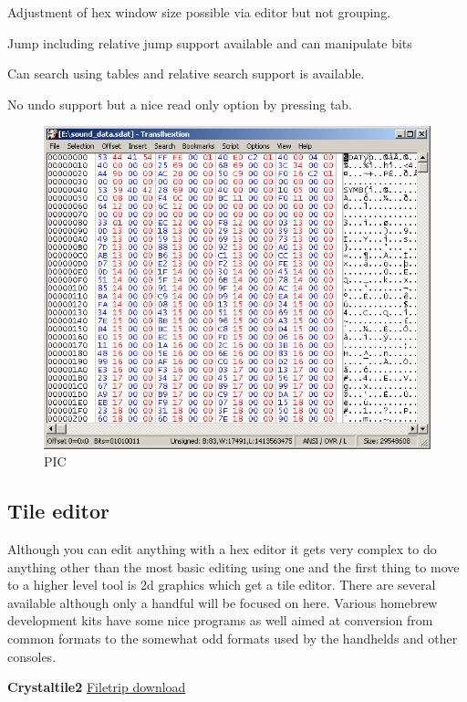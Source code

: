 \documentclass[
]{book}
\begin{document}
Adjustment of hex window size possible via editor but not grouping.

Jump including relative jump support available and can manipulate bits

Can search using tables and relative search support is available.

No undo support but a nice read only option by pressing tab.

\begin{figure}
\centering
\includegraphics{images/11_home_fast6191_romhackingguide_unrenamed_file___ackingguidehexeditorsshowcasetranslhextion1.png}
\caption{PIC}
\end{figure}

\hypertarget{tile-editor}{%
\subsection{Tile editor}\label{tile-editor}}

Although you can edit anything with a hex editor it gets very complex to do anything other than the most basic editing using one and the first thing to move to a higher level tool is 2d graphics which get a tile editor. There are several available although only a handful will be focused on here. Various homebrew development kits have some nice programs as well aimed at conversion from common formats to the somewhat odd formats used by the handhelds and other consoles.

\textbf{Crystaltile2} \href{http://filetrip.net/f23649-CrystalTile2-2010-09-06.html}{Filetrip download}
\end{document}
